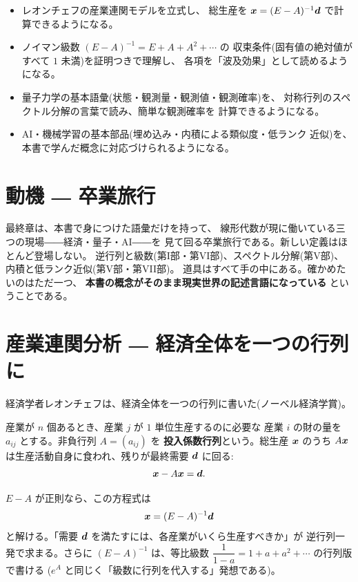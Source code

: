 \begin{goal}
\begin{itemize}
\item レオンチェフの産業連関モデルを立式し、
総生産を $\bm{x} = (E - A)^{-1}\bm{d}$ で計算できるようになる。
\item ノイマン級数 $(E - A)^{-1} = E + A + A^2 + \cdots$ の
収束条件(固有値の絶対値がすべて $1$ 未満)を証明つきで理解し、
各項を「波及効果」として読めるようになる。
\item 量子力学の基本語彙(状態・観測量・観測値・観測確率)を、
対称行列のスペクトル分解の言葉で読み、簡単な観測確率を
計算できるようになる。
\item AI・機械学習の基本部品(埋め込み・内積による類似度・低ランク
近似)を、本書で学んだ概念に対応づけられるようになる。
\end{itemize}
\end{goal}

\section{動機 ― 卒業旅行}

最終章は、本書で身につけた語彙だけを持って、
線形代数が現に働いている三つの現場――経済・量子・AI――を
見て回る卒業旅行である。新しい定義はほとんど登場しない。
逆行列と級数(第I部・第VI部)、スペクトル分解(第V部)、
内積と低ランク近似(第V部・第VII部)。
道具はすべて手の中にある。確かめたいのはただ一つ、
\textbf{本書の概念がそのまま現実世界の記述言語になっている}
ということである。

\section{産業連関分析 ― 経済全体を一つの行列に}

経済学者レオンチェフは、経済全体を一つの行列に書いた(ノーベル経済学賞)。

\begin{teigi}[投入係数行列]\label{def:final-leontief}
産業が $n$ 個あるとき、産業 $j$ が $1$ 単位生産するのに必要な
産業 $i$ の財の量を $a_{ij}$ とする。非負行列 $A = (a_{ij})$ を
\textbf{投入係数行列}という。総生産 $\bm{x}$ のうち
$A\bm{x}$ は生産活動自身に食われ、残りが最終需要 $\bm{d}$ に回る:
\[
\bm{x} - A\bm{x} = \bm{d}.
\]
\end{teigi}

$E - A$ が正則なら、この方程式は
\[
\bm{x} = (E - A)^{-1}\bm{d}
\]
と解ける。「需要 $\bm{d}$ を満たすには、各産業がいくら生産すべきか」が
逆行列一発で求まる。さらに $(E - A)^{-1}$ は、等比級数
$\dfrac{1}{1 - a} = 1 + a + a^2 + \cdots$ の行列版で書ける
($e^A$ と同じく「級数に行列を代入する」発想である)。

